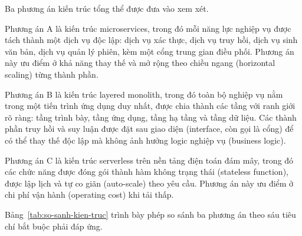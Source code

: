 Ba phương án kiến trúc tổng thể được đưa vào xem xét.

Phương án A là kiến trúc microservices, trong đó mỗi năng lực nghiệp vụ được tách thành một dịch vụ độc lập: dịch vụ xác thực, dịch vụ truy hồi, dịch vụ sinh văn bản, dịch vụ quản lý phiên, kèm một cổng trung gian điều phối. Phương án này ưu điểm ở khả năng thay thế và mở rộng theo chiều ngang (horizontal scaling) từng thành phần.

Phương án B là kiến trúc layered monolith, trong đó toàn bộ nghiệp vụ nằm trong một tiến trình ứng dụng duy nhất, được chia thành các tầng với ranh giới rõ ràng: tầng trình bày, tầng ứng dụng, tầng hạ tầng và tầng dữ liệu. Các thành phần truy hồi và suy luận được đặt sau giao diện (interface, còn gọi là cổng) để có thể thay thế độc lập mà không ảnh hưởng logic nghiệp vụ (business logic).

Phương án C là kiến trúc serverless trên nền tảng điện toán đám mây, trong đó các chức năng được đóng gói thành hàm không trạng thái (stateless function), được lập lịch và tự co giãn (auto-scale) theo yêu cầu. Phương án này ưu điểm ở chi phí vận hành (operating cost) khi tải thấp.

Bảng~\ref{tab:so-sanh-kien-truc} trình bày phép so sánh ba phương án theo sáu tiêu chí bắt buộc phải đáp ứng.

